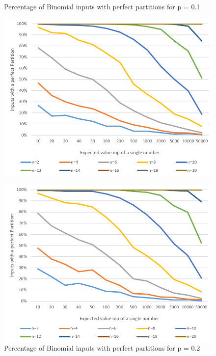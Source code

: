 \begin{figure}[h]
      \centering
      \begin{minipage}[b]{0.45\textwidth}
            \caption{Percentage of Binomial inputs with perfect partitions for p = 0.1}
            \includegraphics[width=\textwidth]{figures/images/solvabilityOfInputs/solvability0_1.png}\label{fig:firstBinPercentage2}
      \end{minipage}
      \hspace{0.75cm}
      \begin{minipage}[b]{0.45\textwidth}
            \caption{Percentage of Binomial inputs with perfect partitions for p = 0.2}
            \includegraphics[width=\textwidth]{figures/images/solvabilityOfInputs/solvability0_2.png}
      \end{minipage}
\end{figure}



